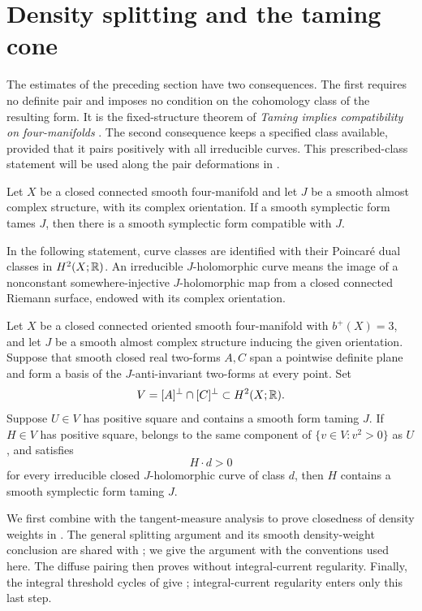 \section{Density splitting and the taming cone}\label{sec:density-splitting}

The estimates of the preceding section have two consequences.  The first
requires no definite pair and imposes no condition on the cohomology class
of the resulting form. It is the fixed-structure theorem of
\emph{Taming implies compatibility on four-manifolds}
\cite[Theorem~1.1]{OpenAITaming2026}. The second consequence keeps a
specified class available, provided that it pairs positively with all
irreducible curves. This prescribed-class statement will be used along
the pair deformations in .

\begin{theorem}\label{thm:tamed-compatible}
Let \(X\) be a closed connected smooth four-manifold and let \(J\) be a
smooth almost complex structure, with its complex orientation.  If a
smooth symplectic form tames \(J\), then there is a smooth symplectic form
compatible with \(J\).
\end{theorem}

In the following statement, curve
classes are identified with their Poincar\'e dual classes in
\(H^2(X;\mathbb R)\).  An irreducible \(J\)-holomorphic curve means the image of a
nonconstant somewhere-injective \(J\)-holomorphic map from a closed
connected Riemann surface, endowed with its complex orientation.

\begin{theorem}\label{thm:taming-cone}
Let \(X\) be a closed connected oriented smooth four-manifold with
\(b^+(X)=3\), and let \(J\) be a smooth almost complex structure inducing
the given orientation.  Suppose that smooth closed real two-forms \(A,C\)
span a pointwise definite plane and form a basis of the
\(J\)-anti-invariant two-forms at every point.  Set
\[
 V=[A]^\perp\cap[C]^\perp\subset H^2(X;\mathbb R).
\]
Suppose \(U\in V\) has positive square and contains a smooth form taming
\(J\).  If \(H\in V\) has positive square, belongs to the same component of
\(\{v\in V:v^2>0\}\) as \(U\), and satisfies
\[
 H\cdot d>0
\]
for every irreducible closed \(J\)-holomorphic curve of class \(d\), then
\(H\) contains a smooth symplectic form taming \(J\).
\end{theorem}

We first combine  with the tangent-measure
analysis to prove closedness of density weights in
. The general splitting argument and its
smooth density-weight conclusion are shared with
\cite[Theorem~5.1 and Section~6, ``Passing to the positive-density set'']{OpenAITaming2026};
we give the argument with the conventions used here. The diffuse pairing then proves
 without integral-current regularity.
Finally, the integral threshold cycles of
 give ;
integral-current regularity enters only this last step.

